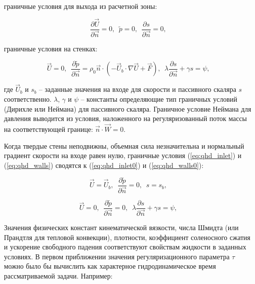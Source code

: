 граничные условия для выхода из расчетной зоны:

\begin{equation}\label{eq:qhd_outlet}
        \frac{\partial \vec{U}}{\partial \vec{n}} = 0, \,\,\, \tilde p = 0, \,\,\, \frac{\partial s}{ \partial \vec{n}} = 0,
\end{equation}

граничные условия на стенках:

\begin{equation}\label{eq:qhd_walls}
        \vec{U} = 0, \,\,\, \frac{\partial \tilde p}{ \partial \vec{n}} = \rho_0 \vec n \cdot \left ( -\vec U_b \cdot \nabla \vec U + \vec F \right), \,\,\, \lambda \frac{\partial s}{ \partial \vec{n}} + \gamma s = \psi,
\end{equation}

\noindent где $\vec U_b$ и $s_b$ -- заданные значения на входе для скорости и пассивного скаляра $s$ соответственно. $\lambda$, $\gamma$ и $\psi$ -- константы определяющие тип граничных условий (Дирихле или Неймана) для пассивного скаляра. Граничное условие Неймана для давления выводится из условия, наложенного на регуляризованный поток массы на соответствующей границе: $\vec n \cdot \vec W = 0$.

Когда твердые стены неподвижны, объемная сила незначительна и нормальный градиент скорости на входе равен нулю, граничные условия (\ref{eq:qhd_inlet}) и (\ref{eq:qhd_walls}) сводятся к (\ref{eq:qhd_inlet0}) и (\ref{eq:qhd_walls0}):

\begin{equation}\label{eq:qhd_inlet0}
      \vec{U} = \vec{U}_b, \,\,\, \frac{\partial \tilde p}{ \partial \vec{n}} = 0, \,\,\, s = s_b,
\end{equation}
  
\begin{equation}\label{eq:qhd_walls0}
      \vec{U} = 0, \,\,\, \frac{\partial \tilde p}{ \partial \vec{n}} = 0, \,\,\, \lambda \frac{\partial s}{ \partial \vec{n}} + \gamma s = \psi,
\end{equation}

Значения физических констант кинематической вязкости, числа Шмидта (или Прандтля для тепловой конвекции), плотности, коэффициент соленосного сжатия и ускорение свободного падения соответствуют свойствам жидкости в заданных условиях. В первом приближении значения регуляризационного параметра $\tau$ можно было бы вычислить как характерное гидродинамическое время рассматриваемой задачи. Например:

